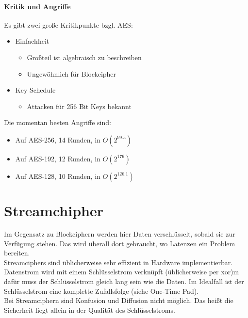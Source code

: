 \paragraph{Kritik und Angriffe}

Es gibt zwei große Kritikpunkte bzgl. AES: 

\begin{itemize}
    \item Einfachheit
    \begin{itemize}
        \item Großteil ist algebraisch zu beschreiben
        \item Ungewöhnlich für Blockcipher
    \end{itemize}
    \item Key Schedule 
    \begin{itemize}
        \item Attacken für 256 Bit Keys bekannt
    \end{itemize}
\end{itemize}

Die momentan besten Angriffe sind:

\begin{itemize}
    \item Auf AES-256, 14 Runden, in $O(2^{99.5})$
    \item Auf AES-192, 12 Runden, in $O(2^{176})$
    \item Auf AES-128, 10 Runden, in $O(2^{126.1})$
\end{itemize}


\section{Streamchipher}

Im Gegensatz zu Blockciphern werden hier Daten verschlüsselt, sobald sie zur
Verfügung stehen. Das wird überall dort gebraucht, wo Latenzen ein Problem bereiten.\\ 

\noindent Streamciphers sind üblicherweise sehr effizient in Hardware implementierbar. \\

\noindent Datenstrom wird mit einem Schlüsselstrom verknüpft (üblicherweise per xor)m dafür muss der Schlüsselstrom gleich lang sein wie die Daten.
Im Idealfall ist der Schlüsselstrom eine komplette Zufallsfolge (siehe One-Time Pad). \\

\noindent Bei Streamciphern sind Konfusion und Diffusion nicht möglich. Das heißt die Sicherheit liegt allein in der Qualität des Schlüsselstroms. \\

